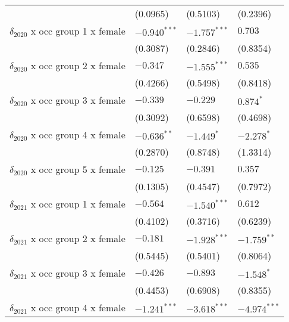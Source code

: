 \begin{tabular}{llll}
                                         &           (0.0965) &           (0.5103) &           (0.2396) \\
$\delta_{2020}$ x occ group 1 x female   &     $-0.940^{***}$ &     $-1.757^{***}$ &            $0.703$ \\
                                         &           (0.3087) &           (0.2846) &           (0.8354) \\
$\delta_{2020}$ x occ group 2 x female   &           $-0.347$ &     $-1.555^{***}$ &            $0.535$ \\
                                         &           (0.4266) &           (0.5498) &           (0.8418) \\
$\delta_{2020}$ x occ group 3 x female   &           $-0.339$ &           $-0.229$ &          $0.874^*$ \\
                                         &           (0.3092) &           (0.6598) &           (0.4698) \\
$\delta_{2020}$ x occ group 4 x female   &      $-0.636^{**}$ &         $-1.449^*$ &         $-2.278^*$ \\
                                         &           (0.2870) &           (0.8748) &           (1.3314) \\
$\delta_{2020}$ x occ group 5 x female   &           $-0.125$ &           $-0.391$ &            $0.357$ \\
                                         &           (0.1305) &           (0.4547) &           (0.7972) \\
$\delta_{2021}$ x occ group 1 x female   &           $-0.564$ &     $-1.540^{***}$ &            $0.612$ \\
                                         &           (0.4102) &           (0.3716) &           (0.6239) \\
$\delta_{2021}$ x occ group 2 x female   &           $-0.181$ &     $-1.928^{***}$ &      $-1.759^{**}$ \\
                                         &           (0.5445) &           (0.5401) &           (0.8064) \\
$\delta_{2021}$ x occ group 3 x female   &           $-0.426$ &           $-0.893$ &         $-1.548^*$ \\
                                         &           (0.4453) &           (0.6908) &           (0.8355) \\
$\delta_{2021}$ x occ group 4 x female   &     $-1.241^{***}$ &     $-3.618^{***}$ &     $-4.974^{***}$ \\

\end{tabular}
